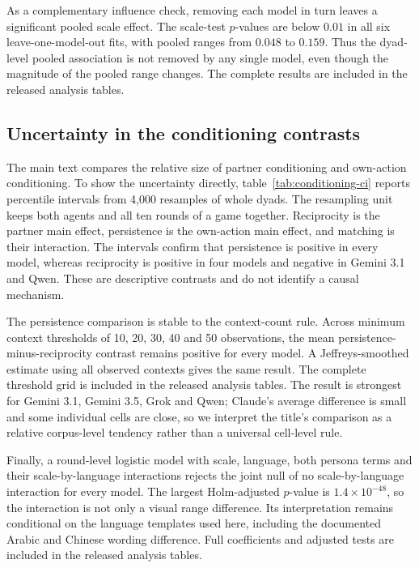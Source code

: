 \documentclass[openacc]{rsproca_new}
\begin{document}
As a complementary influence check, removing each model in turn leaves a
significant pooled scale effect. The scale-test $p$-values are below $0.01$ in
all six leave-one-model-out fits, with pooled ranges from $0.048$ to $0.159$.
Thus the dyad-level pooled association is not removed by any single model,
even though the magnitude of the pooled range changes. The complete results are included in the
released analysis tables.

\subsection{Uncertainty in the conditioning contrasts}\label{appendix:conditioning_ci}

The main text compares the relative size of partner conditioning and own-action
conditioning. To show the uncertainty directly, table~\ref{tab:conditioning-ci}
reports percentile intervals from 4,000 resamples of whole dyads. The resampling
unit keeps both agents and all ten rounds of a game together. Reciprocity is the
partner main effect, persistence is the own-action main effect, and matching is
their interaction. The intervals confirm that persistence is positive in every
model, whereas reciprocity is positive in four models and negative in Gemini
3.1 and Qwen. These are descriptive contrasts and do not identify a causal
mechanism.

The persistence comparison is stable to the context-count rule. Across minimum
context thresholds of 10, 20, 30, 40 and 50 observations, the mean
persistence-minus-reciprocity contrast remains positive for every model. A
Jeffreys-smoothed estimate using all observed contexts gives the same result.
The complete threshold grid is included in the released analysis tables. The result is strongest for
Gemini 3.1, Gemini 3.5, Grok and Qwen; Claude's average difference is small and
some individual cells are close, so we interpret the title's comparison as a
relative corpus-level tendency rather than a universal cell-level rule.

Finally, a round-level logistic model with scale, language, both persona terms
and their scale-by-language interactions rejects the joint null of no
scale-by-language interaction for every model. The largest Holm-adjusted
$p$-value is $1.4\times10^{-48}$, so the interaction is not only a visual
range difference. Its interpretation remains conditional on the language
templates used here, including the documented Arabic and Chinese wording
difference. Full coefficients and adjusted tests are included in the released
analysis tables.
\end{document}
